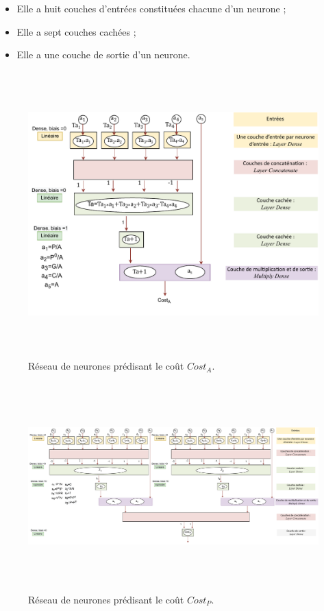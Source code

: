 \begin{itemize}[label=$\square$]
	\item Elle a huit couches d'entrées constituées chacune d'un neurone ;
	\item Elle a sept couches cachées ;
	\item Elle a une couche de sortie d'un neurone.
\end{itemize}  


\begin{figure}[H]
	\centerline{
		\includegraphics[height=11cm]{images_these/im_1_PROD_cost_value.pdf}}
	\caption[Réseau de neurones prédisant le coût $Cost_A$]{Réseau de neurones prédisant le coût $Cost_A$.}
	\label{1_PROD_cost_value}
\end{figure}

\begin{figure}[H]
	\centerline{
		\includegraphics[height=8cm]{images_these/im_2_PROD_cost_value.pdf}}
	\caption[Réseau de neurones prédisant le coût $Cost_P$]{Réseau de neurones prédisant le coût  $Cost_P$.}
	\label{2_PROD_cost_value}
\end{figure}



